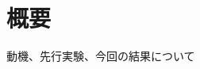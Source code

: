 \documentclass[uplatex,11pt,a4paper,dvipdfmx]{jsreport}
\begin{document}
\chapter*{概要}
動機、先行実験、今回の結果について
\end{document}
